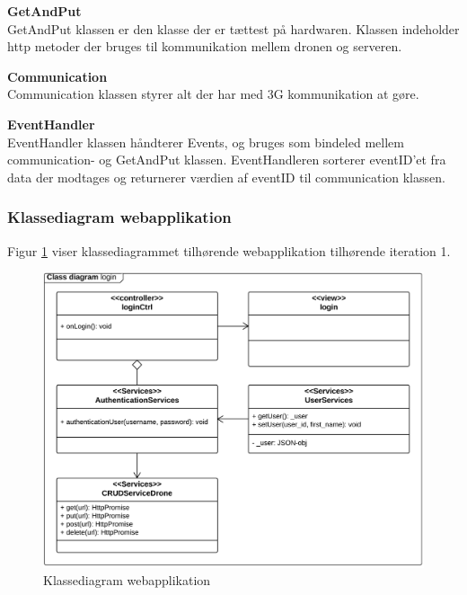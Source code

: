 \textbf{GetAndPut} \\
GetAndPut klassen er den klasse der er tættest på hardwaren. Klassen indeholder http metoder der bruges til kommunikation mellem dronen og serveren. 

\textbf{Communication} \\
Communication klassen styrer alt der har med 3G kommunikation at gøre.

\textbf{EventHandler} \\
EventHandler klassen håndterer Events, og bruges som bindeled mellem communication- og GetAndPut klassen. EventHandleren sorterer eventID'et fra data der modtages og returnerer værdien af eventID til communication klassen. 


\newpage

\subsubsection*{Klassediagram webapplikation}
\vspace{-0.3cm}
Figur \ref{fig:classDiagram_webapplikation} viser klassediagrammet tilhørende webapplikation tilhørende iteration 1.

\vspace{-0.2cm}
\begin{figure}[H]
	\centering
	\includegraphics[width=1\textwidth]{Billeder/klasse_diagrammer/login_class_diagram.png}
	\vspace{-0.6cm}
	\caption{Klassediagram webapplikation}
	\label{fig:classDiagram_webapplikation}
\end{figure}

